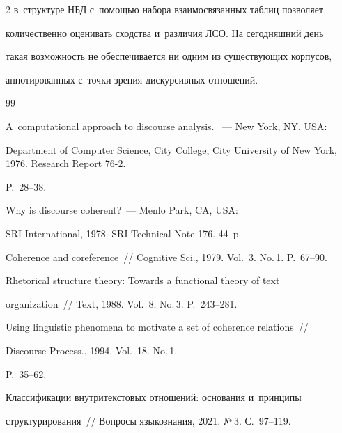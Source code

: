 \begin{multicols}{2}
в~структуре НБД с~помощью набора взаимосвязанных таблиц позволяет 


количественно оценивать сходства и~различия ЛСО. На сегодняшний день 


такая возможность не обеспечивается ни одним из существующих корпусов, 


аннотированных с~точки зрения дискурсивных отношений. 


   


{\small\frenchspacing


 {%




 \begin{thebibliography}{99}







 A~computational approach to discourse analysis. ~--- New York, NY, USA: 


Department of Computer Science, City College, City University of New York, 1976. Research Report 76-2.


P.~28--38.




 Why is discourse coherent?~--- Menlo Park, CA, USA: 


SRI International, 1978. SRI Technical Note 176. 44~p.




 Coherence and coreference~// Cognitive Sci., 1979. Vol.~3. No.\,1. P.~67--90. 




 Rhetorical structure theory: Towards a functional theory of text 


organization~// Text, 1988. Vol.~8. No.\,3. P.~243--281. 




 Using linguistic phenomena to motivate a set of coherence relations~// 


Discourse Process., 1994. Vol.~18. No.\,1. 


P.~35--62.




 Классификации внутритекстовых отношений: основания и~принципы 


структурирования~// Вопросы языкознания, 2021. №\,3. С.~97--119. 



\end{thebibliography}}}
\end{multicols}
